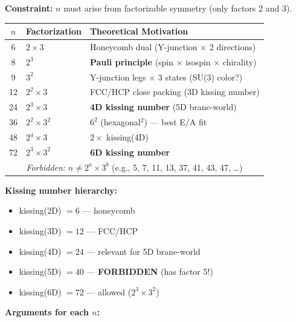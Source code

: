 \begin{tcolorbox}[colback=yellow!5!white, colframe=yellow!75!black, title=Allowed Coordination Numbers]
\textbf{Constraint:} $n$ must arise from factorizable symmetry (only factors 2 and 3).

\begin{center}
\begin{tabular}{cll}
\hline
$n$ & Factorization & Theoretical Motivation \\
\hline
6 & $2 \times 3$ & Honeycomb dual (Y-junction $\times$ 2 directions) \\
8 & $2^3$ & \textbf{Pauli principle} (spin $\times$ isospin $\times$ chirality) \\
9 & $3^2$ & Y-junction legs $\times$ 3 states (SU(3) color?) \\
12 & $2^2 \times 3$ & FCC/HCP close packing (3D kissing number) \\
\hline
24 & $2^3 \times 3$ & \textbf{4D kissing number} (5D brane-world) \\
36 & $2^2 \times 3^2$ & $6^2$ (hexagonal$^2$) --- best E/A fit \\
48 & $2^4 \times 3$ & $2 \times$ kissing(4D) \\
72 & $2^3 \times 3^2$ & \textbf{6D kissing number} \\
\hline
\multicolumn{3}{c}{\emph{Forbidden:} $n \neq 2^a \times 3^b$ (e.g., 5, 7, 11, 13, 37, 41, 43, 47, \ldots)} \\
\hline
\end{tabular}
\end{center}

\textbf{Kissing number hierarchy:}
\begin{itemize}
    \item kissing(2D) $= 6$ --- honeycomb
    \item kissing(3D) $= 12$ --- FCC/HCP
    \item kissing(4D) $= 24$ --- relevant for 5D brane-world
    \item kissing(5D) $= 40$ --- \textbf{FORBIDDEN} (has factor 5!)
    \item kissing(6D) $= 72$ --- allowed ($2^3 \times 3^2$)
\end{itemize}
\end{tcolorbox}

\textbf{Arguments for each $n$:}

